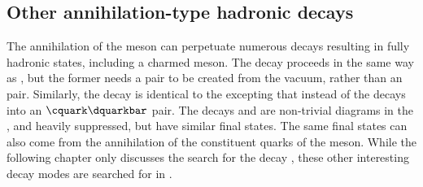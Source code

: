 \subsection{Other annihilation-type hadronic decays}
The annihilation of the \Bp meson can perpetuate numerous decays resulting in fully hadronic
states, including a charmed meson.
The decay \decay{\Bp}{\Dp\Kstarz} proceeds in the same way as
\btodsphi, but the former needs a \ddbar pair to be created from the \QCD vacuum, rather than an
\ssbar pair.
Similarly, the decay \decay{\Bp}{\Ds\Kstarzb} is identical to the \btodsphi excepting that instead
of \decay{\Wp}{\cquark\squarkbar} the \Wp decays into an $\cquark\dquarkbar$ pair.
The decays \decay{\Bp}{\Dp\Kstarzb} and \decay{\Bp}{\Ds\Kstarz} are non-trivial diagrams in the
\sm, and heavily suppressed, but have similar final states.
The same final states can also come from the annihilation of the constituent
quarks of the \Bc meson.
While the following chapter only discusses the search for the decay \btodsphi, these other
interesting decay modes are searched for in
.






